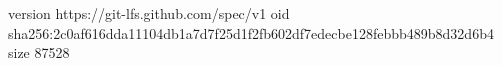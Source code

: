 version https://git-lfs.github.com/spec/v1
oid sha256:2c0af616dda11104db1a7d7f25d1f2fb602df7edecbe128febbb489b8d32d6b4
size 87528
